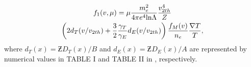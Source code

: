 
 %

\begin{multline}
  f_1(v, \mu) = \mu \frac{m_e^2}{4 \pi e^4\text{ln}\Lambda} 
  \frac{v_{2 th}^4}{Z}
  \\
  \left( 2 d_T(v/v_{2 th}) 
  + \frac{3}{2}\frac{\gamma_T}{\gamma_E} d_E(v/v_{2 th}) \right) 
  \frac{f_M(v)}{n_e}\frac{\nabla T}{T}  ,
  \label{eq:f1_SH}
\end{multline}
where $d_T(x) = \Zbar D_{T}(x) / B$ and $d_E(x) = \Zbar D_{E}(x) / A$ 
are represented by numerical values in TABLE I and TABLE II in 
\cite{SpitzerHarm_PR1953}, respectively. 

